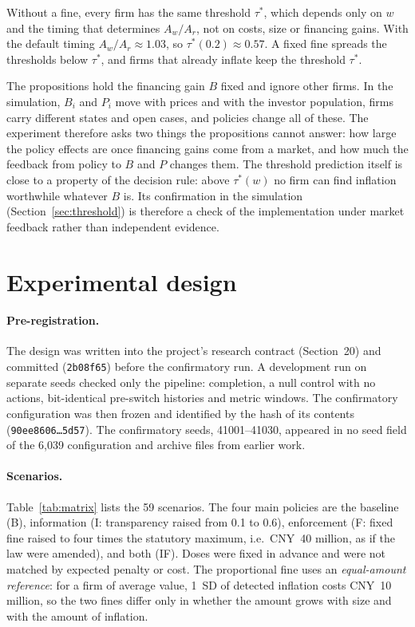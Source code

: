 \documentclass[11pt]{article}
\begin{document}
Without a fine, every firm has the same threshold $\tau^*$, which depends only on $w$ and the timing that determines $A_w/A_r$, not on costs, size or financing gains. With the default timing $A_w/A_r \approx 1.03$, so $\tau^*(0.2) \approx 0.57$. A fixed fine spreads the thresholds below $\tau^*$, and firms that already inflate keep the threshold $\tau^*$.

The propositions hold the financing gain $B$ fixed and ignore other firms. In the simulation, $B_i$ and $P_i$ move with prices and with the investor population, firms carry different states and open cases, and policies change all of these. The experiment therefore asks two things the propositions cannot answer: how large the policy effects are once financing gains come from a market, and how much the feedback from policy to $B$ and $P$ changes them. The threshold prediction itself is close to a property of the decision rule: above $\tau^*(w)$ no firm can find inflation worthwhile whatever $B$ is. Its confirmation in the simulation (Section~\ref{sec:threshold}) is therefore a check of the implementation under market feedback rather than independent evidence.

\section{Experimental design}\label{sec:design}

\paragraph{Pre-registration.} The design was written into the project's research contract (Section~20) and committed (\texttt{2b08f65}) before the confirmatory run. A development run on separate seeds checked only the pipeline: completion, a null control with no actions, bit-identical pre-switch histories and metric windows. The confirmatory configuration was then frozen and identified by the hash of its contents (\texttt{90ee8606\ldots5d57}). The confirmatory seeds, 41001--41030, appeared in no seed field of the 6,039 configuration and archive files from earlier work.

\paragraph{Scenarios.} Table~\ref{tab:matrix} lists the 59 scenarios. The four main policies are the baseline (B), information (I: transparency raised from 0.1 to 0.6), enforcement (F: fixed fine raised to four times the statutory maximum, i.e.\ CNY~40 million, as if the law were amended), and both (IF). Doses were fixed in advance and were not matched by expected penalty or cost. The proportional fine uses an \emph{equal-amount reference}: for a firm of average value, 1~SD of detected inflation costs CNY~10 million, so the two fines differ only in whether the amount grows with size and with the amount of inflation.
\end{document}
